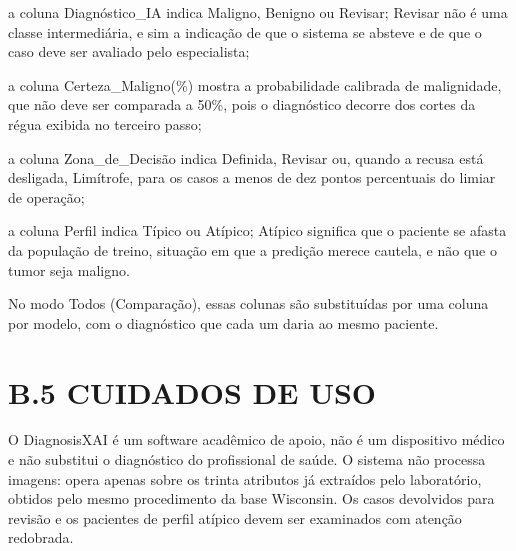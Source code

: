 \documentclass[
    12pt
    ,oneside
    ,a4paper
    ,chapter=TITLE
    ,section=TITLE
    ,sumario=abnt-6027-2012
    ,english,brazil]{abntex2} %
\begin{document}
\begin{alineas}
    \item a coluna Diagnóstico\_IA indica Maligno, Benigno ou Revisar; Revisar
          não é uma classe intermediária, e sim a indicação de que o sistema se
          absteve e de que o caso deve ser avaliado pelo especialista;
    \item a coluna Certeza\_Maligno(\%) mostra a probabilidade calibrada de
          malignidade, que não deve ser comparada a 50\%, pois o diagnóstico
          decorre dos cortes da régua exibida no terceiro passo;
    \item a coluna Zona\_de\_Decisão indica Definida, Revisar ou, quando a
          recusa está desligada, Limítrofe, para os casos a menos de dez pontos
          percentuais do limiar de operação;
    \item a coluna Perfil indica Típico ou Atípico; Atípico significa que o
          paciente se afasta da população de treino, situação em que a
          predição merece cautela, e não que o tumor seja maligno.
\end{alineas}

No modo Todos (Comparação), essas colunas são substituídas por uma coluna por
modelo, com o diagnóstico que cada um daria ao mesmo paciente.

\section*{B.5 CUIDADOS DE USO}

O DiagnosisXAI é um software acadêmico de apoio, não é um dispositivo
médico e não substitui o diagnóstico do profissional de saúde. O sistema não
processa imagens: opera apenas sobre os trinta atributos já extraídos pelo
laboratório, obtidos pelo mesmo procedimento da base Wisconsin. Os casos
devolvidos para revisão e os pacientes de perfil atípico devem ser examinados
com atenção redobrada.
\end{document}
